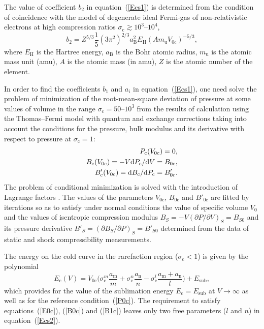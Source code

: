 \documentclass[a4paper]{jpconf}
\begin{document}
The value of coefficient $b_2$ in equation~(\ref{Ecs1}) is determined from the condition of coincidence with the model of degenerate ideal Fermi-gas of non-relativistic electrons \cite{Landau-Lifshitz-V-1980-eng} at high compression ratios $\sigma_\mathrm{c} \gtrsim 10^3$--$10^4$,
%
\begin{equation}
b_2=Z^{5/3}\frac{1}{5}\left(3\pi^2\right)^{2/3}a_\mathrm{B}^2E_\mathrm{H}\left(Am_\mathrm{u}V_\mathrm{0c}\right)^{-5/3},
\end{equation}
%
where $E_\mathrm{H}$ is the Hartree energy,
$a_\mathrm{B}$ is the Bohr atomic radius,
$m_\mathrm{u}$ is the atomic mass unit (amu),
$A$ is the atomic mass (in amu),
$Z$ is the atomic number of the element.

In order to find the coefficients $b_1$ and $a_i$ in equation~(\ref{Ecs1}), one need solve the problem of minimization of the root-mean-square deviation of pressure at some values of volume in the range $\sigma_\mathrm{c}=50$--$10^3$ from the results of calculation using the Thomas--Fermi model with quantum and exchange corrections \cite{Kalitkin-Kuzmina-1975-eng} taking into account the conditions for the pressure, bulk modulus and its derivative with respect to pressure at $\sigma_\mathrm{c}=1$:
%
\begin{eqnarray}
P_\mathrm{c}(V_\mathrm{0c})=0,\label{P0c}\\
B_\mathrm{c}(V_\mathrm{0c})=-V\mathrm{d} P_\mathrm{c}/\mathrm{d} V=B_\mathrm{0c},\label{B0c}\\
B'_\mathrm{c}(V_\mathrm{0c})=\mathrm{d} B_\mathrm{c}/\mathrm{d} P_\mathrm{c}=B'_\mathrm{0c}\label{B1c}.
\end{eqnarray}
%
The problem of conditional minimization is solved with the introduction of Lagrange factors \cite{Bushman-Fortov-Lomonosov-1991-proc}. The values of the parameters $V_\mathrm{0c}$, $B_\mathrm{0c}$ and $B'_\mathrm{0c}$ are fitted by iterations so as to satisfy under normal conditions the value of specific volume $V_0$ and the values of isentropic compression modulus $B_S=-V(\partial P/\partial V)_S=B_{S0}$ and its pressure derivative $B'_S=\left(\partial B_S/\partial P\right)_S=B'_{S0}$ determined from the data of static and shock compressibility measurements.

The energy on the cold curve in the rarefaction region ($\sigma_\mathrm{c}<1$) is given by the polynomial
%
\begin{equation}\label{Ecs2}
E_\mathrm{c}(V) = V_\mathrm{0c} \bigg(\sigma_\mathrm{c}^m \frac{a_\mathrm{m}}{m} + \sigma_\mathrm{c}^n \frac{a_\mathrm{n}}{n}-\sigma_\mathrm{c}^l \frac{a_\mathrm{m} +a_\mathrm{n}}{l}\bigg) + E_\mathrm{sub},
\end{equation}
%
which provides for the value of the sublimation energy $E_\mathrm{c}=E_\mathrm{sub}$ at $V\to \infty$ as well as for the reference condition~(\ref{P0c}).
The requirement to satisfy equations~(\ref{E0c}), (\ref{B0c}) and (\ref{B1c}) leaves only two free parameters ($l$ and $n$) in equation~(\ref{Ecs2}).
\end{document}
